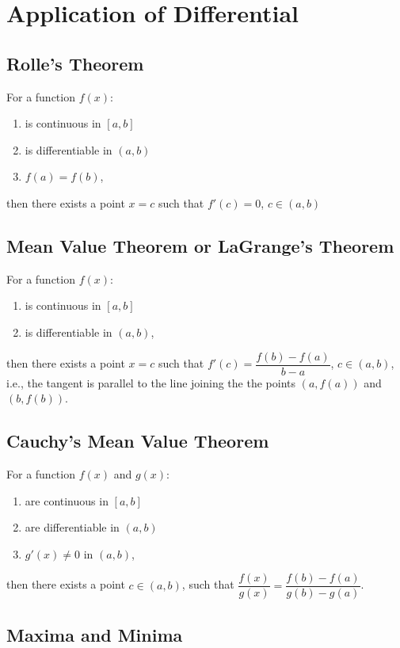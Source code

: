 \documentclass[../main.tex]{subfile}
\begin{document}
    \chapter{Application of Differential}
    \section{Rolle's Theorem}
    For a function $f(x)$:
    \begin{enumerate}
        \item is continuous in $[a,b]$
        \item is differentiable in $(a,b)$
        \item $f(a)=f(b)$,
    \end{enumerate}
    then there exists a point $x=c$ such that $f'(c)=0$, $c\in(a,b)$

    \section{Mean Value Theorem or LaGrange's Theorem}
    For a function $f(x)$:
    \begin{enumerate}
        \item is continuous in $[a,b]$
        \item is differentiable in $(a,b)$,
    \end{enumerate}
    then there exists a point $x=c$ such that $f'(c)=\dfrac{f(b)-f(a)}{b-a}$, $c\in(a,b)$, i.e., the tangent is parallel to the line joining the the points $(a,f(a))$ and $(b,f(b))$.

    \section{Cauchy's Mean Value Theorem}
    For a function $f(x)$ and $g(x)$:
    \begin{enumerate}
        \item are continuous in $[a,b]$
        \item are differentiable in $(a,b)$
        \item $g'(x)\neq 0$ in $(a,b)$,
    \end{enumerate}
    then there exists a point $c\in(a,b)$, such that $\dfrac{f(x)}{g(x)}=\dfrac{f(b)-f(a)}{g(b)-g(a)}$.

    \section{Maxima and Minima}
\end{document}
